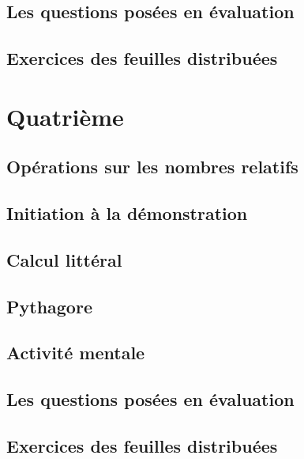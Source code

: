 \documentclass[a4paper,12pt]{book}
\begin{document}
\chapter{Les questions posées en évaluation}


\chapter{Exercices des feuilles distribuées}


\part{Quatrième}

\chapter{Opérations sur les nombres relatifs}


\chapter{Initiation à la démonstration}


\chapter{Calcul littéral}


\chapter{Pythagore}


\chapter{Activité mentale}


\chapter{Les questions posées en évaluation}


\chapter{Exercices des feuilles distribuées}

\end{document}
